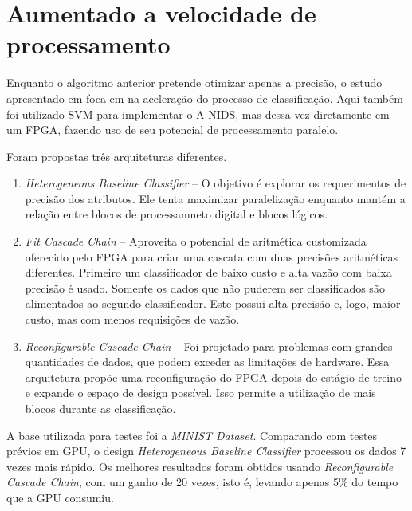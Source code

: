 
\section{Aumentado a velocidade de processamento}
Enquanto o algoritmo anterior pretende otimizar apenas a precisão, o estudo apresentado em \cite{papadonikolakis12}
foca em na aceleração do processo de classificação. Aqui também foi utilizado SVM para implementar o A-NIDS, mas dessa
vez diretamente em um FPGA, fazendo uso de seu potencial de processamento paralelo.
\par Foram propostas três arquiteturas diferentes.
\begin{enumerate}
    \item \textit{Heterogeneous Baseline Classifier} -- O objetivo é explorar os requerimentos de precisão dos atributos. Ele
    tenta maximizar paralelização enquanto mantém a relação entre blocos de processamneto digital e blocos lógicos.
    \item \textit{Fit Cascade Chain} -- Aproveita o potencial de aritmética customizada oferecido pelo FPGA para criar uma
    cascata com duas precisões aritméticas diferentes. Primeiro um classificador de baixo custo e alta vazão com baixa
    precisão é usado. Somente os dados que não puderem ser classificados são alimentados ao segundo classificador. Este
    possui alta precisão e, logo, maior custo, mas com menos requisições de vazão.
    \item \textit{Reconfigurable Cascade Chain} -- Foi projetado para problemas com grandes quantidades de dados, que podem
    exceder as limitações de hardware. Essa arquitetura propõe uma reconfiguração do FPGA depois do estágio de treino e
    expande o espaço de design possível. Isso permite a utilização de mais blocos durante as classificação.
\end{enumerate}
\par A base utilizada para testes foi a \textit{MINIST Dataset}. Comparando com testes prévios em GPU, o design
\textit{Heterogeneous Baseline Classifier} processou os dados 7 vezes mais rápido. Os melhores resultados foram
obtidos usando \textit{Reconfigurable Cascade Chain}, com um ganho de 20 vezes, isto é, levando apenas 5\% do tempo
que a GPU consumiu.